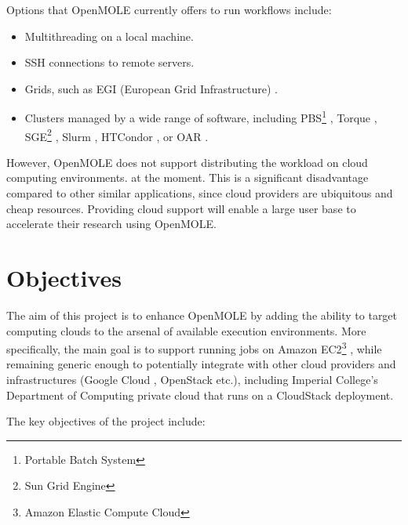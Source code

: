 Options that OpenMOLE currently offers to run workflows include:

\begin{itemize}
	\item Multithreading on a local machine.
	\item SSH connections to remote servers.
	\item Grids, such as EGI (European Grid Infrastructure) \cite{EGI}.
	\item Clusters managed by a wide range of software, including PBS\footnote{Portable Batch System} \cite{PBS}, Torque \cite{Torque}, SGE\footnote{Sun Grid Engine} \cite{SGE}, Slurm \cite{SLURM}, HTCondor \cite{HTCondor}, or OAR \cite{OAR}.
\end{itemize}

However, OpenMOLE does not support distributing the workload on cloud computing environments. at the moment. This is a significant disadvantage compared to other similar applications, since cloud providers are ubiquitous and cheap resources. Providing cloud support will enable a large user base to accelerate their research using OpenMOLE.

\section{Objectives}

The aim of this project is to enhance OpenMOLE by adding the ability to target computing clouds to the arsenal of available execution environments. More specifically, the main goal is to support running jobs on Amazon EC2\footnote{Amazon Elastic Compute Cloud} \cite{EC2}, while remaining generic enough to potentially integrate with other cloud providers and infrastructures (Google Cloud \cite{GoogleCloud}, OpenStack \cite{OpenStack} etc.), including Imperial College's Department of Computing private cloud that runs on a CloudStack \cite{CloudStack} deployment.

The key objectives of the project include:

